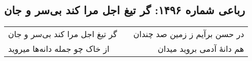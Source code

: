 \begin{center}
\section*{رباعی شماره ۱۴۹۶: گر تیغ اجل مرا کند بی‌سر و جان}
\label{sec:1496}
\begin{longtable}{l p{0.5cm} r}
گر تیغ اجل مرا کند بی‌سر و جان
&&
در حسن برآیم ز زمین صد چندان
\\
از خاک چو جمله دانه‌ها میروید
&&
هم دانهٔ آدمی بروید میدان
\\
\end{longtable}
\end{center}
